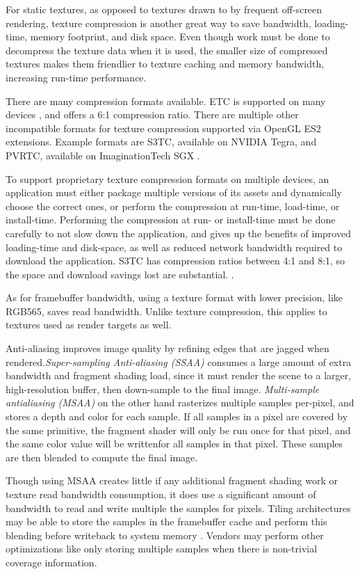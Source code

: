
For static textures, as opposed to textures drawn to by frequent off-screen
rendering, texture compression is another great way to save bandwidth,
loading-time, memory footprint, and disk space.  Even though work must be done
to decompress the texture data when it is used, the smaller size of compressed
textures makes them friendlier to texture caching and memory bandwidth,
increasing run-time performance. 

There are many compression formats available.  ETC is supported on many devices
\cite{Unity11b}, and offers a 6:1 compression ratio.  There are multiple other
incompatible formats for texture compression supported via OpenGL ES2
extensions.  Example formats are S3TC, available on NVIDIA Tegra, and PVRTC,
available on ImaginationTech SGX \cite{Motorola11}.

To support proprietary texture compression formats on multiple devices, an
application must either package multiple versions of its assets and dynamically
choose the correct ones, or perform the compression at run-time, load-time, or
install-time.  Performing the compression at run- or install-time must be done
carefully to not slow down the application, and gives up the benefits of
improved loading-time and disk-space, as well as reduced network bandwidth
required to download the application.  S3TC has compression ratios between 4:1
and 8:1, so the space and download savings lost are substantial.
\cite{Domine00}.

As for framebuffer bandwidth, using a texture format with lower precision, like
RGB565, saves read bandwidth.  Unlike texture compression, this applies to
textures used as render targets as well.

 Anti-aliasing improves image quality by refining edges
that are jagged when rendered.\textit{Super-sampling Anti-aliasing (SSAA)}
consumes a large amount of extra bandwidth and fragment shading load, since it
must render the scene to a larger, high-resolution buffer, then down-sample to
the final image.  \textit{Multi-sample antialiasing (MSAA)} on the other hand
rasterizes multiple samples per-pixel, and stores a depth and color for each
sample.  If all samples in a pixel are covered by the same primitive, the
fragment shader will only be run once for that pixel, and the same color value
will be writtenfor all samples in that pixel.  These samples are then blended
to compute the final image. \cite{aths03}

Though using MSAA creates little if any additional fragment shading work or
texture read bandwidth consumption, it does use a significant amount of
bandwidth to read and write multiple the samples for pixels.  Tiling
architectures may be able to store the samples in the framebuffer cache and
perform this blending before writeback to system memory \cite{POWERVR11}.
Vendors may perform other optimizations like only storing multiple samples when
there is non-trivial coverage information.
